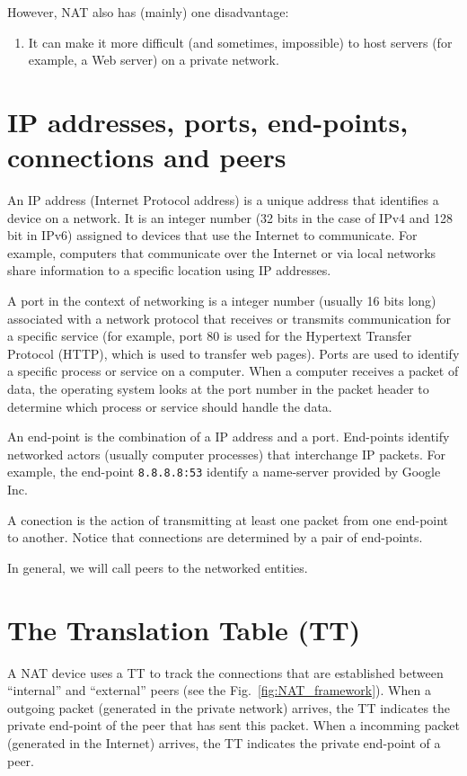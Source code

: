 However, NAT also has (mainly) one disadvantage:
\begin{enumerate}
\item It can make it more difficult (and sometimes, impossible) to host
  servers (for example, a Web server) on a private network.
\end{enumerate}

\section{IP addresses, ports, end-points, connections and peers}

An IP address (Internet Protocol address) is a unique address that
identifies a device on a network. It is an integer number (32 bits in
the case of IPv4 and 128 bit in IPv6) assigned to devices that use the
Internet to communicate. For example, computers that communicate over
the Internet or via local networks share information to a specific
location using IP addresses.

A port in the context of networking is a integer number (usually 16
bits long) associated with a network protocol that receives or
transmits communication for a specific service (for example, port 80
is used for the Hypertext Transfer Protocol (HTTP), which is used to
transfer web pages). Ports are used to identify a specific process or
service on a computer. When a computer receives a packet of data, the
operating system looks at the port number in the packet header to
determine which process or service should handle the data.

An end-point is the combination of a IP address and a port. End-points
identify networked actors (usually computer processes) that
interchange IP packets. For example, the end-point \texttt{8.8.8.8:53}
identify a name-server provided by Google Inc.

A conection is the action of transmitting at least one packet from one
end-point to another. Notice that connections are determined by a pair
of end-points.

In general, we will call peers to the networked entities.

\section{The Translation Table (TT)}

A NAT device uses a TT to track the connections that are established
between ``internal'' and ``external'' peers (see the
Fig.~\ref{fig:NAT_framework}). When a outgoing packet (generated in
the private network) arrives, the TT indicates the private end-point
of the peer that has sent this packet. When a incomming packet
(generated in the Internet) arrives, the TT indicates the private
end-point of a peer.

